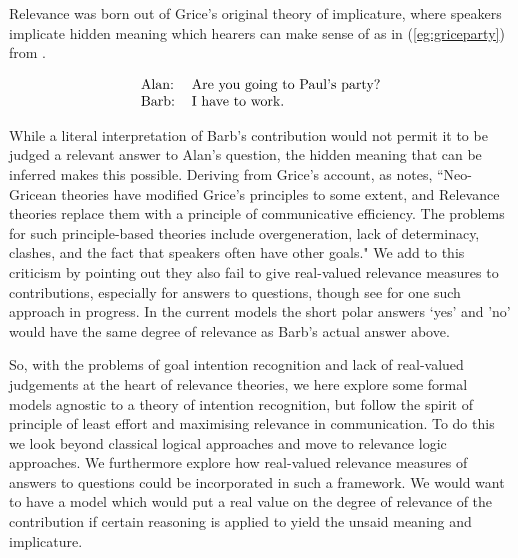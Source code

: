 \documentclass[11pt,a4paper]{article}
\theoremstyle{definition}
\begin{document}
Relevance was born out of Grice's original theory of implicature, where speakers implicate hidden meaning which hearers can make sense of as in (\ref{eg:griceparty}) from \cite{Davis2014implicature}.


\begin{equation}
\label{eg:griceparty}
\text{
\begin{tabular}{ll}
    Alan: & Are you going to Paul's party?\\
    Barb: & I have to work.
\end{tabular}
}
\end{equation}

While a literal interpretation of Barb's contribution would not permit it to be judged a relevant answer to Alan's question, the hidden meaning that can be inferred makes this possible. Deriving from Grice's account, as  notes, ``Neo-Gricean theories have modified Grice's principles to some extent, and Relevance theories replace them with a principle of communicative efficiency. The problems for such principle-based theories include overgeneration, lack of determinacy, clashes, and the fact that speakers often have other goals." We add to this criticism by pointing out they also fail to give real-valued relevance measures to contributions, especially for answers to questions, though see \cite{HoughPurver2017Lattices} for one such approach in progress. In the current models the short polar answers `yes' and 'no' would have the same degree of relevance as Barb's actual answer above.

So, with the problems of goal intention recognition and lack of real-valued judgements at the heart of relevance theories, we here explore some formal models agnostic to a theory of intention recognition, but follow the spirit of principle of least effort and maximising relevance in communication. To do this we look beyond classical logical approaches and move to relevance logic approaches. We furthermore explore how real-valued relevance measures of answers to questions could be incorporated in such a framework. We would want to have a model which would put a real value on the degree of relevance of the contribution if certain reasoning is applied to yield the unsaid meaning and implicature.
\end{document}
